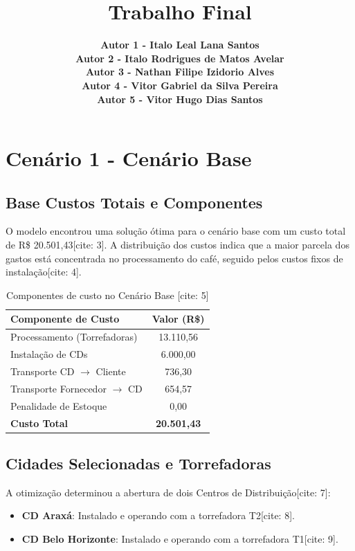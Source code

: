 \documentclass[a4paper,11pt]{article}
\title{Trabalho Final}
\author{\textbf{Autor 1 - Italo Leal Lana Santos}\\\textbf{Autor 2 - Italo Rodrigues de Matos Avelar}\\\textbf{Autor 3 - Nathan Filipe Izidorio Alves}\\\textbf{Autor 4 - Vitor Gabriel da Silva Pereira}\\\textbf{Autor 5 - Vitor Hugo Dias Santos}}
\date{\empty}
\begin{document}
\maketitle
\thispagestyle{empty}
\section{Cenário 1 - Cenário Base}

\subsection{Base Custos Totais e Componentes}

O modelo encontrou uma solução ótima para o cenário base com um custo total de R\$ 20.501,43[cite: 3]. A distribuição dos custos indica que a maior parcela dos gastos está concentrada no processamento do café, seguido pelos custos fixos de instalação[cite: 4].

\begin{table}[H]
\centering
\begin{tabular}{lc}
\hline
\textbf{Componente de Custo} & \textbf{Valor (R\$)} \\ \hline
Processamento (Torrefadoras) & 13.110,56 \\
Instalação de CDs & 6.000,00 \\
Transporte CD $\rightarrow$ Cliente & 736,30 \\
Transporte Fornecedor $\rightarrow$ CD & 654,57 \\
Penalidade de Estoque & 0,00 \\ \hline
\textbf{Custo Total} & \textbf{20.501,43} \\ \hline
\end{tabular}
\caption{Componentes de custo no Cenário Base [cite: 5]}
\label{tab:cenario1_custos}
\end{table}

\subsection{Cidades Selecionadas e Torrefadoras}

A otimização determinou a abertura de dois Centros de Distribuição[cite: 7]:
\begin{itemize}
    \item \textbf{CD Araxá}: Instalado e operando com a torrefadora T2[cite: 8].
    \item \textbf{CD Belo Horizonte}: Instalado e operando com a torrefadora T1[cite: 9].
\end{itemize}
\end{document}
